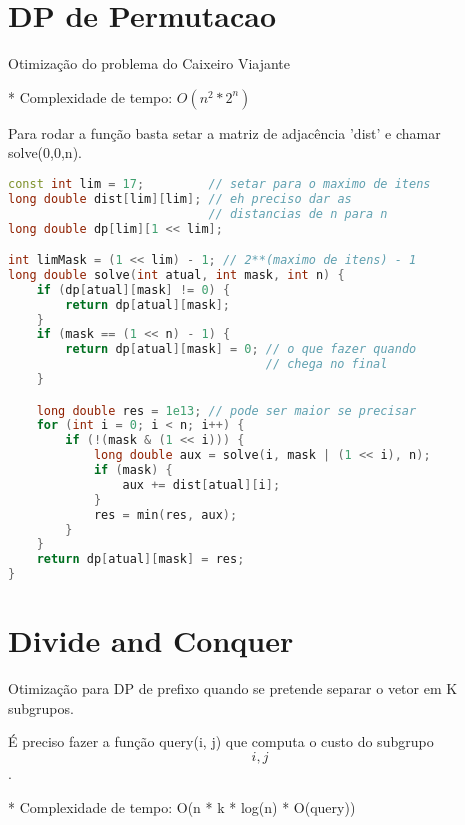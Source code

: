 \documentclass[11pt, a4paper, oneside]{book}
\begin{document}
\hfill

\section{DP de Permutacao}


Otimização do problema do Caixeiro Viajante



* Complexidade de tempo: $O(n^2 * 2^n)$



Para rodar a função basta setar a matriz de adjacência 'dist' e chamar solve(0,0,n).

\hfill

\begin{multicols}{2}
\begin{lstlisting}[language=C++]
const int lim = 17;         // setar para o maximo de itens
long double dist[lim][lim]; // eh preciso dar as
                            // distancias de n para n
long double dp[lim][1 << lim];

int limMask = (1 << lim) - 1; // 2**(maximo de itens) - 1
long double solve(int atual, int mask, int n) {
    if (dp[atual][mask] != 0) {
        return dp[atual][mask];
    }
    if (mask == (1 << n) - 1) {
        return dp[atual][mask] = 0; // o que fazer quando
                                    // chega no final
    }

    long double res = 1e13; // pode ser maior se precisar
    for (int i = 0; i < n; i++) {
        if (!(mask & (1 << i))) {
            long double aux = solve(i, mask | (1 << i), n);
            if (mask) {
                aux += dist[atual][i];
            }
            res = min(res, aux);
        }
    }
    return dp[atual][mask] = res;
}
\end{lstlisting}
\end{multicols}

\hfill

\section{Divide and Conquer}


Otimização para DP de prefixo quando se pretende separar o vetor em K subgrupos.    



É preciso fazer a função query(i, j) que computa o custo do subgrupo \[i, j\].

* Complexidade de tempo: O(n * k * log(n) *  O(query))
\end{document}
